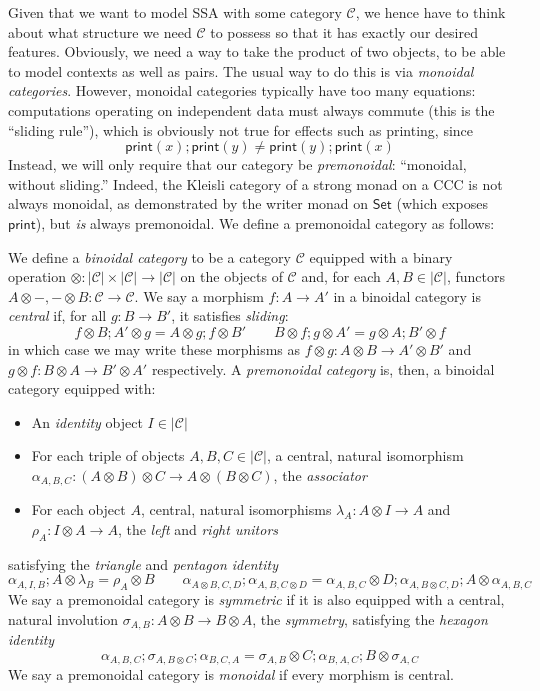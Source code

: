 \documentclass[acmsmall,screen,review]{acmart}
\newcommand{\mc}[1]{\ensuremath{\mathcal{#1}}}
\newcommand{\ms}[1]{\ensuremath{\mathsf{#1}}}
\begin{document}
Given that we want to model SSA with some category $\mc{C}$, we hence have to think about what
structure we need $\mc{C}$ to possess so that it has exactly our desired features.
Obviously, we need a way to take the product of two objects, to be able to model contexts as well as
pairs. The usual way to do this is via \emph{monoidal categories}. However, monoidal categories
typically have too many
equations: computations operating on independent data must always commute
(this is the ``sliding rule''), which is obviously not true for effects such as printing, since
$$
\ms{print}(x) ; \ms{print}(y) \neq \ms{print}(y) ; \ms{print}(x)
$$
Instead, we will only require that our category be \emph{premonoidal}: ``monoidal, without
sliding.'' Indeed, the Kleisli category of a strong monad on a CCC is not always monoidal, as
demonstrated by the writer monad on $\ms{Set}$ (which exposes $\ms{print}$), but \emph{is} always
premonoidal. We define a premonoidal category as follows:
\begin{definition}
  We define a \emph{binoidal category} to be a category $\mc{C}$ equipped with a binary operation
  $\otimes : |\mc{C}| \times |\mc{C}| \to |\mc{C}|$ on the objects of $\mc{C}$ and, for each $A, B
  \in |\mc{C}|$, functors $A \otimes -, - \otimes B : \mc{C} \to \mc{C}$. We say a morphism $f : A
  \to A'$ in a binoidal category is \emph{central} if, for all $g : B \to B'$, it satisfies
  \emph{sliding}:
  $$
  f \otimes B ; A' \otimes g = A \otimes g ; f \otimes B' \qquad
  B \otimes f ; g \otimes A' = g \otimes A ; B' \otimes f
  $$
  in which case we may write these morphisms as $f \otimes g : A \otimes B \to A' \otimes B'$ and $g
  \otimes f : B \otimes A \to B' \otimes A'$ respectively. A \emph{premonoidal category} is, then, a
  binoidal category equipped with:
  \begin{itemize}
    \item An \emph{identity} object $I \in |\mc{C}|$
    \item For each triple of objects $A, B, C \in |\mc{C}|$, a central, natural isomorphism
    $\alpha_{A, B, C} : (A \otimes B) \otimes C \to A \otimes (B \otimes C)$, the \emph{associator}
    \item For each object $A$, central, natural isomorphisms $\lambda_A : A \otimes I \to A$ and
    $\rho_A : I \otimes A \to A$, the \emph{left} and \emph{right unitors}
  \end{itemize}
  satisfying the \emph{triangle} and \emph{pentagon identity}
  $$
  \alpha_{A, I, B} ; A \otimes \lambda_B = \rho_A \otimes B \qquad
  \alpha_{A \otimes B, C, D} ; \alpha_{A, B, C \otimes D}
  = \alpha_{A, B, C} \otimes D ; \alpha_{A, B \otimes C, D} ; A \otimes \alpha_{A, B, C}
  $$
  We say a premonoidal category is \emph{symmetric} if it is also equipped with a central, natural
  involution $\sigma_{A, B} : A \otimes B \to B \otimes A$, the \textit{symmetry}, satisfying the
  \emph{hexagon identity}
  $$
  \alpha_{A, B, C} ; \sigma_{A, B \otimes C} ; \alpha_{B, C, A}
  = \sigma_{A, B} \otimes C ; \alpha_{B, A, C} ; B \otimes \sigma_{A, C}
  $$
  We say a premonoidal category is \emph{monoidal} if every morphism is central.
\end{definition}
\end{document}
